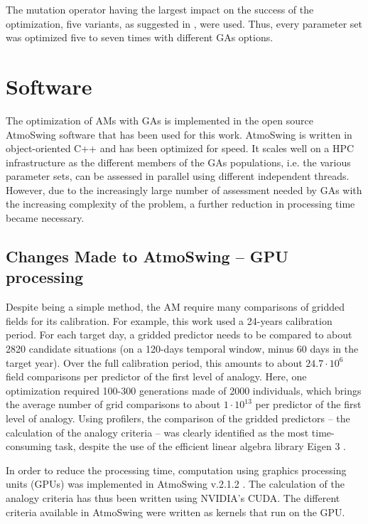 \documentclass[draft]{agujournal2019}
\begin{document}
The mutation operator having the largest impact on the success of the optimization, five variants, as suggested in , were used. Thus, every parameter set was optimized five to seven times with different GAs options.


\section{Software}
\label{software}

The optimization of AMs with GAs is implemented in the open source AtmoSwing software \cite{Horton2019} that has been used for this work. AtmoSwing is written in object-oriented C++ and has been optimized for speed. It scales well on a HPC infrastructure as the different members of the GAs populations, i.e. the various parameter sets, can be assessed in parallel using different independent threads. However, due to the increasingly large number of assessment needed by GAs with the increasing complexity of the problem, a further reduction in processing time became necessary. 

\subsection{Changes Made to AtmoSwing -- GPU processing}

Despite being a simple method, the AM require many comparisons of gridded fields for its calibration. For example, this work used a 24-years calibration period. For each target day, a gridded predictor needs to be compared to about 2820 candidate situations (on a 120-days temporal window, minus 60 days in the target year). Over the full calibration period, this amounts to about $24.7\cdot10^6$ field comparisons per predictor of the first level of analogy. Here, one optimization required 100-300 generations made of 2000 individuals, which brings the average number of grid comparisons to about $1\cdot10^{13}$ per predictor of the first level of analogy. Using profilers, the comparison of the gridded predictors -- the calculation of the analogy criteria -- was clearly identified as the most time-consuming task, despite the use of the efficient linear algebra library Eigen 3 \cite{Guennebaud2010}.

In order to reduce the processing time, computation using graphics processing units (GPUs) was implemented in AtmoSwing v.2.1.2 \cite{Horton2019b}. The calculation of the analogy criteria has thus been written using NVIDIA's CUDA. The different criteria available in AtmoSwing were written as kernels that run on the GPU.
\end{document}
